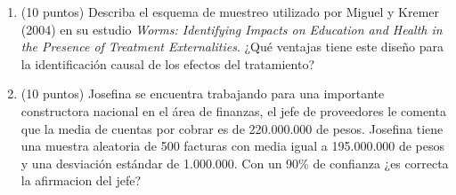 \documentclass[10pt,a4paper]{article}
\begin{document}
\begin{enumerate}

    \item (10 puntos) Describa el esquema de muestreo utilizado por Miguel y Kremer (2004) en su estudio {\it Worms: Identifying Impacts on Education and Health in the Presence of Treatment Externalities}.
    ¿Qué ventajas tiene este diseño para la identificación causal de los efectos del tratamiento?

\item  (10 puntos) Josefina se encuentra trabajando para una importante constructora nacional en el \'area de finanzas, el jefe de
proveedores le comenta que la media de cuentas por cobrar es de 220.000.000 de pesos. Josefina tiene una  muestra aleatoria de 500 facturas con media igual a 195.000.000 de pesos y una desviaci\'on
est\'andar de 1.000.000. Con un 90\% de confianza ¿es correcta la afirmacion del jefe?



\end{enumerate}
\end{document}
